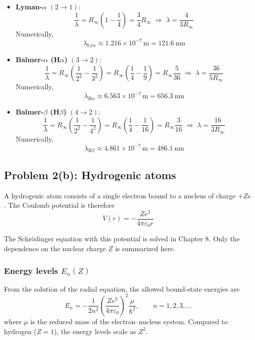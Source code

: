 \documentclass{article}
\begin{document}
\begin{itemize}
\item[(i)] \textbf{Lyman-$\alpha$} $(2\to 1)$:
\[
\frac{1}{\lambda}=R_\infty\!\left(1-\frac{1}{4}\right)=\frac{3}{4}R_\infty
\;\Rightarrow\;
\lambda=\frac{4}{3R_\infty}
\]
Numerically,
\[
\boxed{\;\lambda_{\mathrm{Ly}\alpha}\approx 1.216\times 10^{-7}\,\mathrm{m}=121.6~\mathrm{nm}\;}
\]

\item[(ii)] \textbf{Balmer-$\alpha$ (H$\alpha$)} $(3\to 2)$:
\[
\frac{1}{\lambda}=R_\infty\!\left(\frac{1}{2^2}-\frac{1}{3^2}\right)
=R_\infty\!\left(\frac{1}{4}-\frac{1}{9}\right)
=R_\infty\frac{5}{36}
\;\Rightarrow\;
\lambda=\frac{36}{5R_\infty}
\]
Numerically,
\[
\boxed{\;\lambda_{\mathrm{H}\alpha}\approx 6.563\times 10^{-7}\,\mathrm{m}=656.3~\mathrm{nm}\;}
\]

\item[(iii)] \textbf{Balmer-$\beta$ (H$\beta$)} $(4\to 2)$:
\[
\frac{1}{\lambda}=R_\infty\!\left(\frac{1}{2^2}-\frac{1}{4^2}\right)
=R_\infty\!\left(\frac{1}{4}-\frac{1}{16}\right)
=R_\infty\frac{3}{16}
\;\Rightarrow\;
\lambda=\frac{16}{3R_\infty}
\]
Numerically,
\[
\boxed{\;\lambda_{\mathrm{H}\beta}\approx 4.861\times 10^{-7}\,\mathrm{m}=486.1~\mathrm{nm}\;}
\]
\end{itemize}

\subsection*{Problem 2(b): Hydrogenic atoms}

A hydrogenic atom consists of a single electron bound to a nucleus of charge $+Ze$.
The Coulomb potential is therefore
\[
V(r) = -\frac{Ze^2}{4\pi\varepsilon_0 r}
\]

The Schr\"odinger equation with this potential is solved in Chapter 8.
Only the dependence on the nuclear charge $Z$ is summarized here.

\subsubsection*{Energy levels $E_n(Z)$}

From the solution of the radial equation, the allowed bound-state energies are
\[
E_n = -\frac{1}{2n^2}
\left(\frac{Ze^2}{4\pi\varepsilon_0}\right)^2
\frac{\mu}{\hbar^2},
\qquad n=1,2,3,\dots
\]
where $\mu$ is the reduced mass of the electron--nucleus system.
Compared to hydrogen ($Z=1$), the energy levels scale as $Z^2$.
\end{document}
